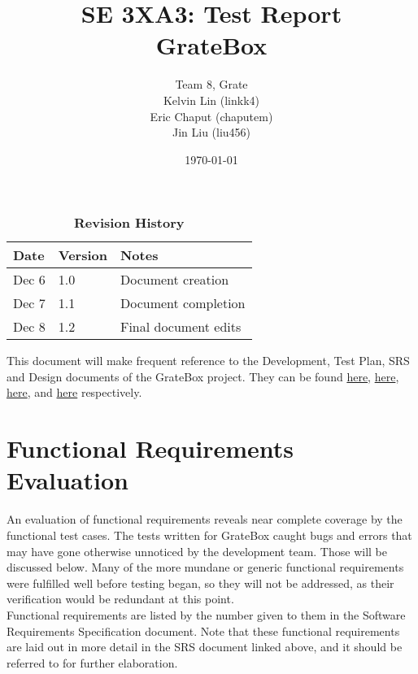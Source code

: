 \documentclass[12pt, titlepage]{article}
\title{SE 3XA3: Test Report\\GrateBox}
\author{Team 8, Grate
		\\ Kelvin Lin (linkk4)
		\\ Eric Chaput (chaputem)
		\\ Jin Liu (liu456)
}
\date{\today}
\begin{document}
\maketitle

\tableofcontents
\listoftables
\listoffigures

\begin{table}[h]
\caption{\bf Revision History}
\begin{tabularx}{\textwidth}{p{3cm}p{2cm}X}
\toprule {\bf Date} & {\bf Version} & {\bf Notes}\\
\midrule
Dec 6 & 1.0 & Document creation\\
Dec 7 & 1.1 & Document completion\\
Dec 8 & 1.2 & Final document edits\\
\bottomrule
\end{tabularx}
\end{table}

\newpage


This document will make frequent reference to the Development, Test Plan, SRS 
and Design documents of the GrateBox project. They can be found 
\href{https://gitlab.cas.mcmaster.ca/linkk4/GrateBox/tree/master/Doc/DevelopmentPlan}{here}, 
\href{https://gitlab.cas.mcmaster.ca/linkk4/GrateBox/tree/master/Doc/TestPlan}{here}, 
\href{https://gitlab.cas.mcmaster.ca/linkk4/GrateBox/tree/master/Doc/SRS}{here}, 
and 
\href{https://gitlab.cas.mcmaster.ca/linkk4/GrateBox/tree/master/Doc/Design}{here} 
respectively.

\section{Functional Requirements Evaluation}

An evaluation of functional requirements reveals near complete coverage by the 
functional test cases. The tests written for GrateBox caught bugs and errors 
that may have gone otherwise unnoticed by the development team. Those will be 
discussed below. Many of the more mundane or generic functional requirements 
were fulfilled well before testing began, so they will not be addressed, as 
their verification would be redundant at this point. \\

Functional requirements are listed by the number given to them in the Software 
Requirements Specification document. Note that these functional requirements are 
laid out in more detail in the SRS document linked above, and it should be 
referred to for further elaboration.\\
\end{document}

